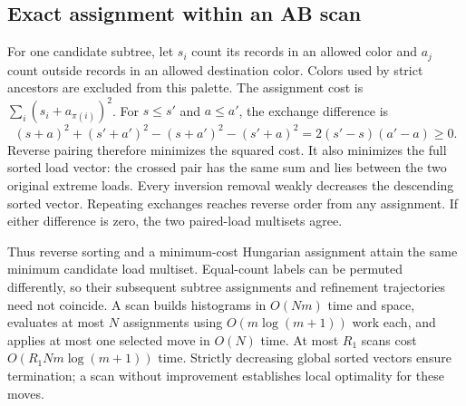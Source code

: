 \subsection{Exact assignment within an AB scan}
\label{sec:ab-sorting-assignment}
For one candidate subtree, let $s_i$ count its records in an allowed
color and $a_j$ count outside records in an allowed destination color.
Colors used by strict ancestors are excluded from this palette.
The assignment cost is $\sum_i(s_i+a_{\pi(i)})^2$.
For $s\le s'$ and $a\le a'$, the exchange difference is
\begin{equation}
 (s+a)^2+(s'+a')^2-(s+a')^2-(s'+a)^2
 =2(s'-s)(a'-a)\ge0.
 \label{eq:supp-count-exchange}
\end{equation}
Reverse pairing therefore minimizes the squared cost. It also
minimizes the full sorted load vector: the crossed pair has the same
sum and lies between the two original extreme loads. Every inversion
removal weakly decreases the descending sorted vector. Repeating
exchanges reaches reverse order from any assignment. If either
difference is zero, the two paired-load multisets agree.

Thus reverse sorting and a minimum-cost Hungarian assignment attain
the same minimum candidate load multiset. Equal-count labels can be
permuted differently, so their subsequent subtree assignments and
refinement trajectories need not coincide. A scan builds histograms
in $O(Nm)$ time and space, evaluates at most $N$ assignments using
$O(m\log(m+1))$ work each, and applies at most one selected move in
$O(N)$ time. At most $R_1$ scans cost $O(R_1Nm\log(m+1))$ time.
Strictly decreasing global sorted vectors ensure termination; a scan
without improvement establishes local optimality for these moves.
